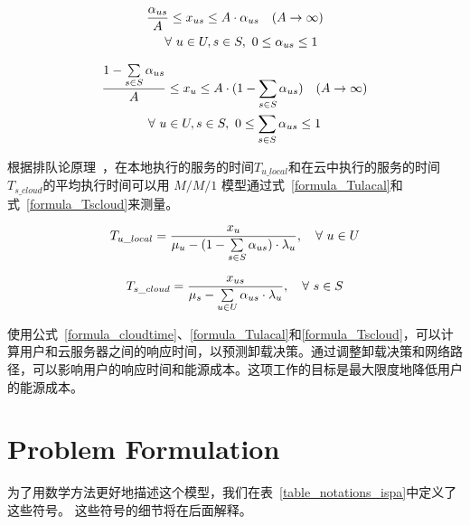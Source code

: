 \begin{equation}
  \label{formula_xus}
  \begin{gathered}
  \frac{{\alpha}_{us}}{A} \leq {x}_{us} \leq A \cdot {\alpha}_{us} \quad (A \to \infty) \\
  \quad \forall \ u \in U, s \in S, \ 0\leq {\alpha}_{us} \leq 1
  \end{gathered}
\end{equation}

\vspace{-0.5em}
\begin{equation}
\label{formula_xu}
\begin{gathered}
\frac{1 - \sum\limits_{s \in S}{{\alpha}_{us}}}{A} \leq {x}_{u} \leq A \cdot (1 - \sum_{s \in S}{{\alpha}_{us}}) \quad (A \to \infty) \\
\forall\ u \in U, s \in S, \ 0\leq \sum_{s \in S}{{\alpha}_{us}} \leq 1
\end{gathered}
\end{equation}

根据排队论原理~\cite{Queueing:systems}，在本地执行的服务的时间$T_{u\_local}$和在云中执行的服务的时间$T_{s\_cloud}$的平均执行时间可以用 $M/M/1$ 模型通过式~\eqref{formula_Tulacal}和式~\eqref{formula_Tscloud}来测量。

\vspace{-0.5em}
\begin{equation}
\label{formula_Tulacal}
{T}_{u\_local} = \frac{{x}_{u}}{{\mu}_{u} - (1 - \sum\limits_{s \in S} {\alpha}_{us}) \cdot {\lambda}_{u}}, \quad \forall \ u \in U
\end{equation}


\begin{equation}
\label{formula_Tscloud}
{T}_{s\_cloud} = \frac{{x}_{us}}{{\mu}_{s} - \sum\limits_{u \in U} {\alpha}_{us} \cdot {\lambda}_{u}}, \quad \forall \ s \in S
\end{equation}

使用公式~\eqref{formula_cloudtime}、\eqref{formula_Tulacal}和\eqref{formula_Tscloud}，可以计算用户和云服务器之间的响应时间，以预测卸载决策。通过调整卸载决策和网络路径，可以影响用户的响应时间和能源成本。这项工作的目标是最大限度地降低用户的能源成本。

\section{Problem Formulation}

为了用数学方法更好地描述这个模型，我们在表~\ref{table_notations_ispa}中定义了这些符号。 这些符号的细节将在后面解释。

